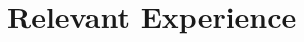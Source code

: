 \documentclass[10pt, letterpaper]{article}
\newenvironment{onecolentry}{
    \begin{adjustwidth}{
        0.2 cm + 0.00001 cm
    }{
        0.2 cm + 0.00001 cm
    }
}{
    \end{adjustwidth}
} %
\begin{document}

          









\section{Relevant Experience}
\end{document}
